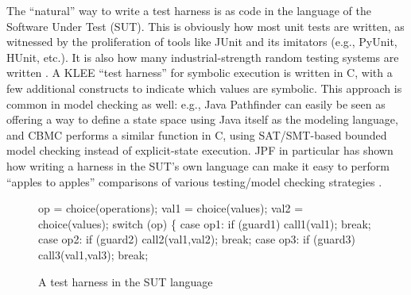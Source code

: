 \documentclass[runningheads,a4paper]{llncs}
\begin{document}
The ``natural'' way to write a test harness is as code in the language
of the Software Under Test (SUT).  This is obviously how most unit
tests are written, as witnessed by the proliferation of tools like
JUnit \cite{JUnit} and its imitators (e.g., PyUnit, HUnit, etc.).  It
is also how many industrial-strength random testing systems are
written \cite{ICSEDiff,AMAI}.  A KLEE ``test harness'' \cite{KLEE} for
symbolic execution is written in C, with a few additional constructs
to indicate which values are symbolic.  This approach is common in
model checking as well: e.g., Java Pathfinder \cite{JPF,JPF2} can
easily be seen as offering a way to define a state space using Java
itself as the modeling language, and CBMC \cite{CBMC,CBMCp} performs a
similar function in C, using SAT/SMT-based bounded model checking
instead of explicit-state execution.  JPF in particular has shown how
writing a harness in the SUT's own language can make it easy to
perform ``apples to apples'' comparisons of various testing/model
checking strategies \cite{JPFRandTest}.

\begin{figure}[t]
{\scriptsize
\begin{code}
op = choice(operations);
val1 = choice(values);
val2 = choice(values);
switch (op) \{
case op1:  if (guard1)
              call1(val1);
           break;
case op2:  if (guard2)
              call2(val1,val2);
           break;
case op3:  if (guard3)
              call3(val1,val3);
           break;
\end{code}
}
\vspace{-0.15in}
\caption {A test harness in the SUT language}
\label{fig:badharness}
\end{figure}
\end{document}

